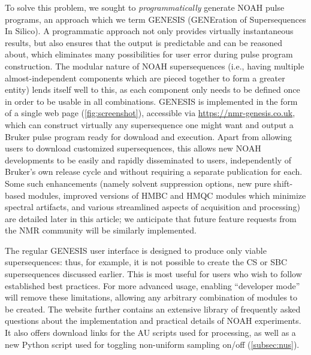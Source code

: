 \documentclass[a4paper,11pt]{article}
\newcommand{\theurl}{\url{https://nmr-genesis.co.uk}}
\begin{document}
\begin{refsection}
To solve this problem, we sought to \textit{programmatically} generate NOAH pulse programs, an approach which we term GENESIS (GENEration of Supersequences In Silico).
A programmatic approach not only provides virtually instantaneous results, but also ensures that the output is predictable and can be reasoned about, which eliminates many possibilities for user error during pulse program construction.
The modular nature of NOAH supersequences (i.e., having multiple almost-independent components which are pieced together to form a greater entity) lends itself well to this, as each component only needs to be defined once in order to be usable in all combinations.
GENESIS is implemented in the form of a single web page (\cref{fig:screenshot}), accessible via \theurl{}, which can construct virtually any supersequence one might want and output a Bruker pulse program ready for download and execution.
Apart from allowing users to download customized supersequences, this allows new NOAH developments to be easily and rapidly disseminated to users, independently of Bruker's own release cycle and without requiring a separate publication for each.
Some such enhancements (namely solvent suppression options, new pure shift-based modules, improved versions of HMBC and HMQC modules which minimize spectral artifacts, and various streamlined aspects of acquisition and processing) are detailed later in this article; we anticipate that future feature requests from the NMR community will be similarly implemented.

The regular GENESIS user interface is designed to produce only viable supersequences: thus, for example, it is not possible to create the CS or SBC supersequences discussed earlier.
This is most useful for users who wish to follow established best practices.
For more advanced usage, enabling ``developer mode'' will remove these limitations, allowing any arbitrary combination of modules to be created.
The website further contains an extensive library of frequently asked questions about the implementation and practical details of NOAH experiments.
It also offers download links for the AU scripts used for processing, as well as a new Python script used for toggling non-uniform sampling on/off (\cref{subsec:nus}).



\end{refsection}
\end{document}
